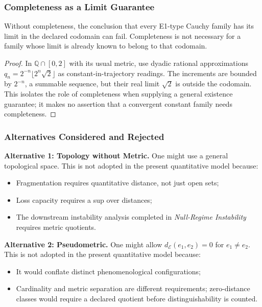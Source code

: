 \subsubsection{Completeness as a Limit Guarantee}

\begin{proposition}\label{prop:complete-necessary}
Without completeness, the conclusion that every E1-type Cauchy family has its limit in the declared codomain can fail. Completeness is not necessary for a family whose limit is already known to belong to that codomain.
\end{proposition}

\begin{proof}
In $\mathbb Q\cap[0,2]$ with its usual metric, use dyadic rational approximations $q_n=2^{-n}\lfloor2^n\sqrt2\rfloor$ as constant-in-trajectory readings. The increments are bounded by $2^{-n}$, a summable sequence, but their real limit $\sqrt2$ is outside the codomain. This isolates the role of completeness when supplying a general existence guarantee; it makes no assertion that a convergent constant family needs completeness.
\end{proof}

\subsubsection{Alternatives Considered and Rejected}

\textbf{Alternative 1: Topology without Metric.}
One might use a general topological space. This is not adopted in the present quantitative model because:
\begin{itemize}[leftmargin=*]
    \item Fragmentation requires quantitative distance, not just open sets;
    \item Loss capacity requires a sup over distances;
    \item The downstream instability analysis completed in \textit{Null-Regime Instability} requires metric quotients.
\end{itemize}

\textbf{Alternative 2: Pseudometric.}
One might allow $d_\mathcal{E}(e_1, e_2) = 0$ for $e_1 \neq e_2$. This is not adopted in the present quantitative model because:
\begin{itemize}[leftmargin=*]
    \item It would conflate distinct phenomenological configurations;
    \item Cardinality and metric separation are different requirements; zero-distance classes would require a declared quotient before distinguishability is counted.
\end{itemize}

